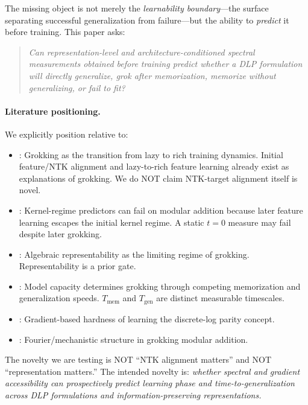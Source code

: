 \documentclass[11pt]{article}
\begin{document}
The missing object is not merely the \emph{learnability boundary}---the surface separating successful generalization from failure---but the ability to \emph{predict} it before training. This paper asks:

\begin{quote}
\emph{Can representation-level and architecture-conditioned spectral measurements obtained before training predict whether a DLP formulation will directly generalize, grok after memorization, memorize without generalizing, or fail to fit?}
\end{quote}

\paragraph{Literature positioning.}
We explicitly position relative to:
\begin{itemize}[leftmargin=*]
    \item \citet{kumar2023grokking}: Grokking as the transition from lazy to rich training dynamics. Initial feature/NTK alignment and lazy-to-rich feature learning already exist as explanations of grokking. We do NOT claim NTK-target alignment itself is novel.
    \item \citet{mohamadi2024grok}: Kernel-regime predictors can fail on modular addition because later feature learning escapes the initial kernel regime. A static $t=0$ measure may fail despite later grokking.
    \item \citet{kam2026algebraic}: Algebraic representability as the limiting regime of grokking. Representability is a prior gate.
    \item \citet{song2025capacity}: Model capacity determines grokking through competing memorization and generalization speeds. $T_{\text{mem}}$ and $T_{\text{gen}}$ are distinct measurable timescales.
    \item \citet{takhanov2024intractability}: Gradient-based hardness of learning the discrete-log parity concept.
    \item \citet{nanda2023progress}: Fourier/mechanistic structure in grokking modular addition.
\end{itemize}

The novelty we are testing is NOT ``NTK alignment matters'' and NOT ``representation matters.'' The intended novelty is: \emph{whether spectral and gradient accessibility can prospectively predict learning phase and time-to-generalization across DLP formulations and information-preserving representations.}
\end{document}
